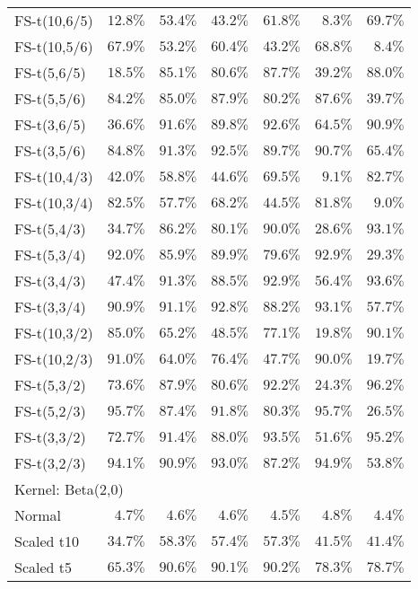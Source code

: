 \begin{longtable}{lrrrrrr}
FS-t(10,6/5) & $12.8\%$ & $53.4\%$ & $43.2\%$ & $61.8\%$ & $8.3\%$ & $69.7\%$ \\ 
FS-t(10,5/6) & $67.9\%$ & $53.2\%$ & $60.4\%$ & $43.2\%$ & $68.8\%$ & $8.4\%$ \\ 
FS-t(5,6/5) & $18.5\%$ & $85.1\%$ & $80.6\%$ & $87.7\%$ & $39.2\%$ & $88.0\%$ \\ 
FS-t(5,5/6) & $84.2\%$ & $85.0\%$ & $87.9\%$ & $80.2\%$ & $87.6\%$ & $39.7\%$ \\ 
FS-t(3,6/5) & $36.6\%$ & $91.6\%$ & $89.8\%$ & $92.6\%$ & $64.5\%$ & $90.9\%$ \\ 
FS-t(3,5/6) & $84.8\%$ & $91.3\%$ & $92.5\%$ & $89.7\%$ & $90.7\%$ & $65.4\%$ \\ 
FS-t(10,4/3) & $42.0\%$ & $58.8\%$ & $44.6\%$ & $69.5\%$ & $9.1\%$ & $82.7\%$ \\ 
FS-t(10,3/4) & $82.5\%$ & $57.7\%$ & $68.2\%$ & $44.5\%$ & $81.8\%$ & $9.0\%$ \\ 
FS-t(5,4/3) & $34.7\%$ & $86.2\%$ & $80.1\%$ & $90.0\%$ & $28.6\%$ & $93.1\%$ \\ 
FS-t(5,3/4) & $92.0\%$ & $85.9\%$ & $89.9\%$ & $79.6\%$ & $92.9\%$ & $29.3\%$ \\ 
FS-t(3,4/3) & $47.4\%$ & $91.3\%$ & $88.5\%$ & $92.9\%$ & $56.4\%$ & $93.6\%$ \\ 
FS-t(3,3/4) & $90.9\%$ & $91.1\%$ & $92.8\%$ & $88.2\%$ & $93.1\%$ & $57.7\%$ \\ 
FS-t(10,3/2) & $85.0\%$ & $65.2\%$ & $48.5\%$ & $77.1\%$ & $19.8\%$ & $90.1\%$ \\ 
FS-t(10,2/3) & $91.0\%$ & $64.0\%$ & $76.4\%$ & $47.7\%$ & $90.0\%$ & $19.7\%$ \\ 
FS-t(5,3/2) & $73.6\%$ & $87.9\%$ & $80.6\%$ & $92.2\%$ & $24.3\%$ & $96.2\%$ \\ 
FS-t(5,2/3) & $95.7\%$ & $87.4\%$ & $91.8\%$ & $80.3\%$ & $95.7\%$ & $26.5\%$ \\ 
FS-t(3,3/2) & $72.7\%$ & $91.4\%$ & $88.0\%$ & $93.5\%$ & $51.6\%$ & $95.2\%$ \\ 
FS-t(3,2/3) & $94.1\%$ & $90.9\%$ & $93.0\%$ & $87.2\%$ & $94.9\%$ & $53.8\%$ \\ 
\midrule
\multicolumn{7}{l}{Kernel: Beta(2,0)} \\ 
\midrule
Normal & $4.7\%$ & $4.6\%$ & $4.6\%$ & $4.5\%$ & $4.8\%$ & $4.4\%$ \\ 
Scaled t10 & $34.7\%$ & $58.3\%$ & $57.4\%$ & $57.3\%$ & $41.5\%$ & $41.4\%$ \\ 
Scaled t5 & $65.3\%$ & $90.6\%$ & $90.1\%$ & $90.2\%$ & $78.3\%$ & $78.7\%$ \\ 

\end{longtable}

